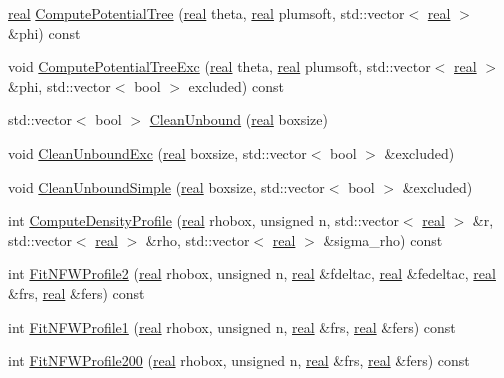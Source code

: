 \begin{DoxyCompactItemize}
\item 
\hyperlink{Global_8h_a031f8951175b43076c2084a6c2173410}{real} \hyperlink{classHaloProperties_a11c11cb2443bb7852e1940617e9fd61c}{ComputePotentialTree} (\hyperlink{Global_8h_a031f8951175b43076c2084a6c2173410}{real} theta, \hyperlink{Global_8h_a031f8951175b43076c2084a6c2173410}{real} plumsoft, std::vector$<$ \hyperlink{Global_8h_a031f8951175b43076c2084a6c2173410}{real} $>$ \&phi) const 
\item 
void \hyperlink{classHaloProperties_a28f6e72bab9459a79bdf665fbd42deab}{ComputePotentialTreeExc} (\hyperlink{Global_8h_a031f8951175b43076c2084a6c2173410}{real} theta, \hyperlink{Global_8h_a031f8951175b43076c2084a6c2173410}{real} plumsoft, std::vector$<$ \hyperlink{Global_8h_a031f8951175b43076c2084a6c2173410}{real} $>$ \&phi, std::vector$<$ bool $>$ excluded) const 
\item 
std::vector$<$ bool $>$ \hyperlink{classHaloProperties_a28b060c3347429056b28f7f2e7603b48}{CleanUnbound} (\hyperlink{Global_8h_a031f8951175b43076c2084a6c2173410}{real} boxsize)
\item 
void \hyperlink{classHaloProperties_acb0b10b15c1312b9431c498875a8d3f4}{CleanUnboundExc} (\hyperlink{Global_8h_a031f8951175b43076c2084a6c2173410}{real} boxsize, std::vector$<$ bool $>$ \&excluded)
\item 
void \hyperlink{classHaloProperties_ad0cd4d6507b2cd05abe9f886d3d5577f}{CleanUnboundSimple} (\hyperlink{Global_8h_a031f8951175b43076c2084a6c2173410}{real} boxsize, std::vector$<$ bool $>$ \&excluded)
\item 
int \hyperlink{classHaloProperties_a07c1aa990f6a5ecc57f88514c152f795}{ComputeDensityProfile} (\hyperlink{Global_8h_a031f8951175b43076c2084a6c2173410}{real} rhobox, unsigned n, std::vector$<$ \hyperlink{Global_8h_a031f8951175b43076c2084a6c2173410}{real} $>$ \&r, std::vector$<$ \hyperlink{Global_8h_a031f8951175b43076c2084a6c2173410}{real} $>$ \&rho, std::vector$<$ \hyperlink{Global_8h_a031f8951175b43076c2084a6c2173410}{real} $>$ \&sigma\_\-rho) const 
\item 
int \hyperlink{classHaloProperties_adfcb17cd8afa75f87274f75a79e212a4}{FitNFWProfile2} (\hyperlink{Global_8h_a031f8951175b43076c2084a6c2173410}{real} rhobox, unsigned n, \hyperlink{Global_8h_a031f8951175b43076c2084a6c2173410}{real} \&fdeltac, \hyperlink{Global_8h_a031f8951175b43076c2084a6c2173410}{real} \&fedeltac, \hyperlink{Global_8h_a031f8951175b43076c2084a6c2173410}{real} \&frs, \hyperlink{Global_8h_a031f8951175b43076c2084a6c2173410}{real} \&fers) const 
\item 
int \hyperlink{classHaloProperties_a33a97caec1229a2bb58d7971e8f7f3b0}{FitNFWProfile1} (\hyperlink{Global_8h_a031f8951175b43076c2084a6c2173410}{real} rhobox, unsigned n, \hyperlink{Global_8h_a031f8951175b43076c2084a6c2173410}{real} \&frs, \hyperlink{Global_8h_a031f8951175b43076c2084a6c2173410}{real} \&fers) const 
\item 
int \hyperlink{classHaloProperties_a6c84410c43d8174b5cd61e728bb002c3}{FitNFWProfile200} (\hyperlink{Global_8h_a031f8951175b43076c2084a6c2173410}{real} rhobox, unsigned n, \hyperlink{Global_8h_a031f8951175b43076c2084a6c2173410}{real} \&frs, \hyperlink{Global_8h_a031f8951175b43076c2084a6c2173410}{real} \&fers) const 
\end{DoxyCompactItemize}

